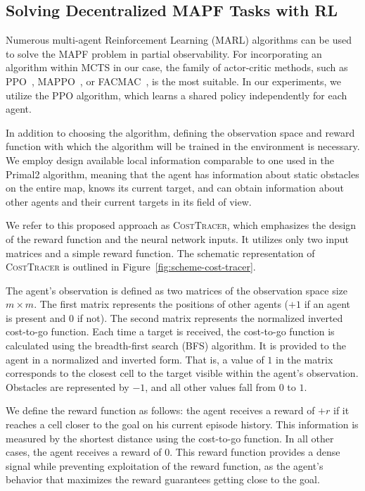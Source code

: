 \documentclass[letterpaper]{article} %
\begin{document}
\subsection{Solving Decentralized MAPF Tasks with RL}



Numerous multi-agent Reinforcement Learning (MARL) algorithms can be used to solve the MAPF problem in partial observability. For incorporating an algorithm within MCTS in our case, the family of actor-critic methods, such as PPO~\cite{schulman2017proximal}, MAPPO~\cite{yu2022surprising}, or FACMAC~\cite{peng2021facmac}, is the most suitable. In our experiments, we utilize the PPO algorithm, which learns a shared policy independently for each agent.

In addition to choosing the algorithm, defining the observation space and reward function with which the algorithm will be trained in the environment is necessary. We employ design available local information comparable to one used in the Primal2 algorithm, meaning that the agent has information about static obstacles on the entire map, knows its current target, and can obtain information about other agents and their current targets in its field of view.

We refer to this proposed approach as \textsc{CostTracer}, which emphasizes the design of the reward function and the neural network inputs. It utilizes only two input matrices and a simple reward function. The schematic representation of \textsc{CostTracer} is outlined in Figure~\ref{fig:scheme-cost-tracer}.


The agent's observation is defined as two matrices of the observation space size $m\times m$.
The first matrix represents the positions of other agents ($+1$ if an agent is present and $0$ if not). The second matrix represents the normalized inverted cost-to-go function. Each time a target is received, the cost-to-go function is calculated using the breadth-first search (BFS) algorithm. It is provided to the agent in a normalized and inverted form. That is, a value of $1$ in the matrix corresponds to the closest cell to the target visible within the agent's observation. Obstacles are represented by $-1$, and all other values fall from $0$ to $1$.

We define the reward function as follows: the agent receives a reward of $+r$ if it reaches a cell closer to the goal on his current episode history. This information is  measured by the shortest distance using the cost-to-go function. In all other cases, the agent receives a reward of $0$. This reward function provides a dense signal while preventing exploitation of the reward function, as the agent's behavior that maximizes the reward guarantees getting close to the goal.
\end{document}
